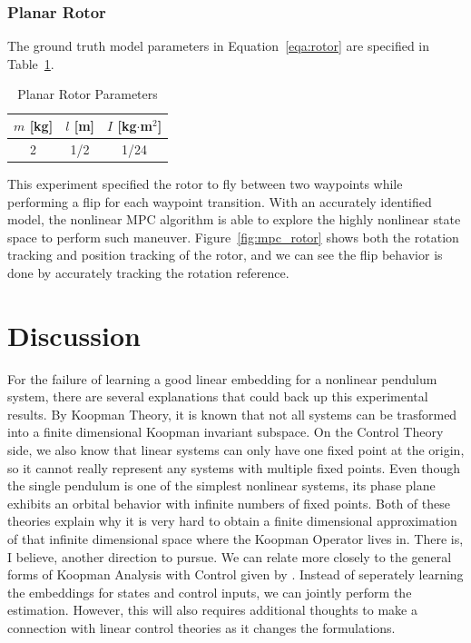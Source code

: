 \documentclass[10pt,twocolumn]{article}
\begin{document}
\subsubsection{Planar Rotor}

The ground truth model parameters in Equation~\ref{eqa:rotor} are specified in
Table~\ref{tbl:rotor_params}.
\begin{table}[h]
  \centering
  \begin{tabular}{ccc}
    \toprule
    $m$ [kg] & $l$ [m] & $I$ [kg$\cdot$m$^2$] \\
    \midrule
    2 & 1/2 & 1/24 \\
    \bottomrule
  \end{tabular}
  \caption{Planar Rotor Parameters}
  \label{tbl:rotor_params}
\end{table}
This experiment specified the rotor to fly between two waypoints while performing a
flip for each waypoint transition. With an accurately identified model, the nonlinear MPC
algorithm is able to explore the highly nonlinear state space to perform such maneuver.
Figure~\ref{fig:mpc_rotor} shows both the rotation tracking and position tracking of the rotor,
and we can see the flip behavior is done by accurately tracking the rotation reference.

\section{Discussion}

For the failure of learning a good linear embedding for a nonlinear pendulum system, there
are several explanations that could back up this experimental results. By Koopman Theory, it is
known that not all systems can be trasformed into a finite dimensional Koopman invariant subspace.
On the Control Theory side, we also know that linear systems can only have one fixed point at
the origin, so it cannot really represent any systems with multiple fixed points. Even though
the single pendulum is one of the simplest nonlinear systems, its phase plane exhibits an
orbital behavior with infinite numbers of fixed points. Both of these theories explain why it
is very hard to obtain a finite dimensional approximation of that infinite dimensional space
where the Koopman Operator lives in. There is, I believe, another direction to pursue.
We can relate more closely to the general forms of Koopman Analysis with Control given by
\cite{generalkoopman}. Instead of seperately learning the embeddings for states and control
inputs, we can jointly perform the estimation. However, this will also requires additional
thoughts to make a connection with linear control theories as it changes the formulations.\\
\end{document}
